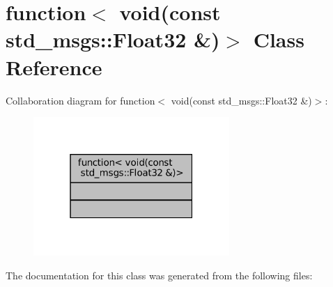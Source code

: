 \hypertarget{classstd_1_1function_3_01void_07const_01std__msgs_1_1Float32_01_6_08_4}{}\section{function$<$ void(const std\+\_\+msgs\+:\+:Float32 \&)$>$ Class Reference}
\label{classstd_1_1function_3_01void_07const_01std__msgs_1_1Float32_01_6_08_4}


Collaboration diagram for function$<$ void(const std\+\_\+msgs\+:\+:Float32 \&)$>$\+:
\nopagebreak
\begin{figure}[H]
\begin{center}
\leavevmode
\includegraphics[width=211pt]{classstd_1_1function_3_01void_07const_01std__msgs_1_1Float32_01_6_08_4__coll__graph}
\end{center}
\end{figure}


The documentation for this class was generated from the following files\+: